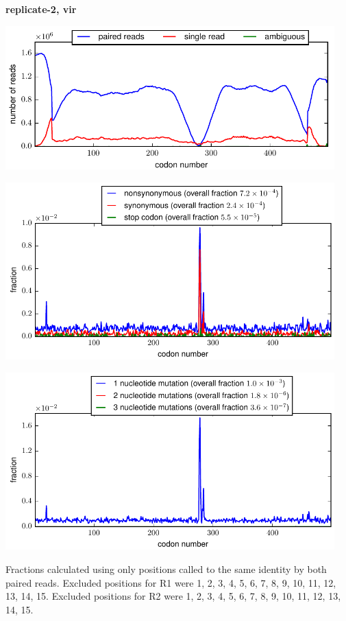\documentclass[10pt,letterpaper]{article}
\begin{document}
\centerline{\Large \bf replicate-2, vir}
\vspace{0.1in}

\centerline{\includegraphics[width=5in]{replicate-2-vir_codondepth.pdf}}
\vspace{0.1in}

\centerline{\includegraphics[width=5in]{replicate-2-vir_syn-ns-dist.pdf}}
\vspace{0.1in}

\centerline{\includegraphics[width=5in]{replicate-2-vir_nmutspercodon-dist.pdf}}
\vspace{0.1in}

Fractions calculated using only positions called to the same identity by both paired reads.  Excluded positions for R1 were 1, 2, 3, 4, 5, 6, 7, 8, 9, 10, 11, 12, 13, 14, 15. 
 Excluded positions for R2 were 1, 2, 3, 4, 5, 6, 7, 8, 9, 10, 11, 12, 13, 14, 15. 
\end{document}
